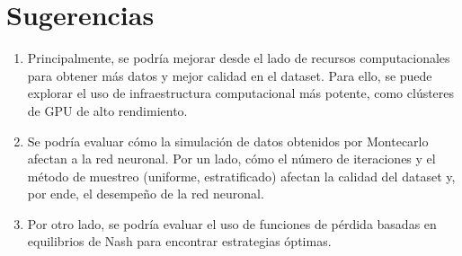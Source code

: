 \section{Sugerencias}
\begin{enumerate}
    \item Principalmente, se podría mejorar desde el lado de recursos computacionales para obtener más datos y mejor calidad en el dataset. Para ello, se puede explorar el uso de infraestructura computacional más potente, como clústeres de GPU de alto rendimiento.
    \item Se podría evaluar cómo la simulación de datos obtenidos por Montecarlo afectan a la red neuronal. Por un lado, cómo el número de iteraciones y el método de muestreo (uniforme, estratificado) afectan la calidad del dataset y, por ende, el desempeño de la red neuronal.
    \item Por otro lado, se podría evaluar el uso de funciones de pérdida basadas en equilibrios de Nash para encontrar estrategias óptimas.
\end{enumerate}